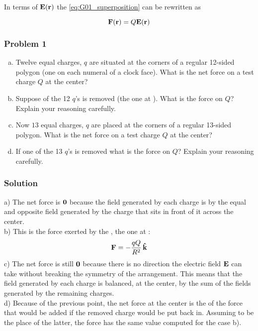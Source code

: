 In terms of $\vb{E}(\vb{r})$ the  \ref{eq:G01_superposition} can be rewritten as 

\begin{equation}
\label{eq:G01_electrostatic_force}
\vb{F}(\vb{r}) = Q \vb{E}(\vb{r})
\end{equation}

\subsubsection*{Problem 1}
\begin{enumerate}[a)]
\item Twelve equal charges, $q$ are situated at the corners of a regular 12-sided polygon (one on each numeral of a clock face). What is the net force on a test charge $Q$ at the center?
\item Suppose  of the 12 $q$'s is removed (the one at ). What is the force on $Q$? Explain your reasoning carefully.
\item Now $13$ equal charges, $q$ are placed at the corners of a regular 13-sided polygon. What is the net force on a test charge $Q$ at the center?
\item If one of the 13 $q$'s is removed what is the force on $Q$? Explain your reasoning carefully.
\end{enumerate}

\subsubsection*{Solution}
a) The net force is $\vb{0}$ because the field generated by each charge is  by the equal and opposite field generated by the charge that sits in front of it across the center.\\
b) This is the force exerted by the , the one at : 
$$ \vb{F} = - \frac{qQ}{R^2}\, \vu{k}$$ 
c) The net force is still $\vb{0}$ because there is no direction the electric field $\vb{E}$ can take without breaking the symmetry of the arrangement. This means that the field generated by each charge is balanced, at the center, by the sum of the fields generated by the remaining charges.\\
d) Because of the previous point, the net force at the center is the  of the force that would be added if the removed charge would be put back in. Assuming  to be the place of the latter, the force has the same value computed for the case b). 

